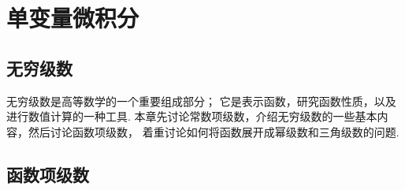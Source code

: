 \part{单变量微积分}

\chapter{无穷级数}
无穷级数是高等数学的一个重要组成部分；
它是表示函数，研究函数性质，以及进行数值计算的一种工具.
本章先讨论常数项级数，介绍无穷级数的一些基本内容，然后讨论函数项级数，
着重讨论如何将函数展开成幂级数和三角级数的问题.




\chapter{函数项级数}








